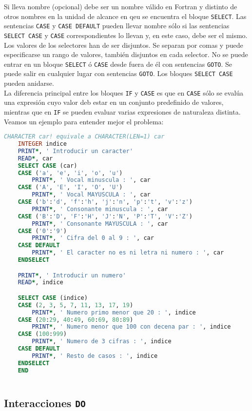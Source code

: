 Si lleva nombre (opcional) debe ser un nombre válido en Fortran y distinto de otros nombres en la unidad de alcance en qeu se encuentra el bloque {\tt SELECT}. Las sentencias \texttt{CASE} y \texttt{CASE DEFAULT} pueden llevar nombre sólo si las sentencias {\tt SELECT CASE} y {\tt CASE} correspondientes lo llevan y, en este caso, debe ser el mismo. Los valores de los selectores han de ser disjuntos. Se separan por comas y puede especificarse un rango de valores, también disjuntos en cada selector. No se puede entrar en un bloque {\tt SELECT} ó {\tt CASE} desde fuera de él con sentencias {\tt GOTO}. Se puede salir en cualquier lugar con sentencias {\tt GOTO}. Los bloques {\tt SELECT CASE} pueden anidarse. \\

La diferencia principal entre los bloques {\tt IF} y {\tt CASE} es que en {\tt CASE} sólo se evalúa una expresión cuyo valor deb estar en un conjunto predefinido de valores, mientras que en {\tt IF} se pueden evaluar varias expresiones de naturaleza distinta. Veamos un ejemplo para entender mejor el problema:

\begin{lstlisting}[language=Fortran]
	CHARACTER car! equivale a CHARACTER(LEN=1) car
	INTEGER indice
	PRINT*, ' Introducir un caracter'
	READ*, car
	SELECT CASE (car)
	CASE ('a', 'e', 'i', 'o', 'u')
		PRINT*, ' Vocal minuscula : ', car
	CASE ('A', 'E', 'I', 'O', 'U')
		PRINT*, ' Vocal MAYUSCULA : ', car
	CASE ('b':'d', 'f':'h', 'j':'n', 'p':'t', 'v':'z')
		PRINT*, ' Consonante minuscula : ', car
	CASE ('B':'D', 'F':'H', 'J':'N', 'P':'T', 'V':'Z')
		PRINT*, ' Consonante MAYUSCULA : ', car
	CASE ('0':'9')
		PRINT*, ' Cifra del 0 al 9 : ', car
	CASE DEFAULT
		PRINT*, ' El caracter no es ni letra ni numero : ', car
	ENDSELECT

	PRINT*, ' Introducir un numero'
	READ*, indice

	SELECT CASE (indice)
	CASE (2, 3, 5, 7, 11, 13, 17, 19)
		PRINT*, ' Numero primo menor que 20 : ', indice
	CASE (20:29, 40:49, 60:69, 80:89)
		PRINT*, ' Numero menor que 100 con decena par : ', indice
	CASE (100:999)
		PRINT*, ' Numero de 3 cifras : ', indice
	CASE DEFAULT
		PRINT*, ' Resto de casos : ', indice
	ENDSELECT
	END
	
\end{lstlisting}

\subsection{Interacciones {\tt DO}}

